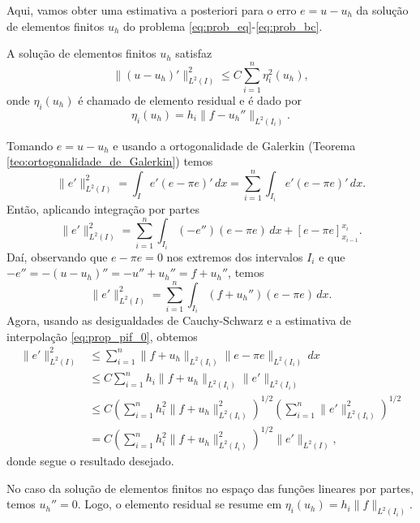 Aqui, vamos obter uma estimativa a posteriori para o erro $e = u - u_h$ da solução de elementos finitos $u_h$ do problema \eqref{eq:prob_eq}-\eqref{eq:prob_bc}.

\begin{teo}\label{teo:fem_est_a_posteriori}
  A solução de elementos finitos $u_h$ satisfaz
  \begin{equation}
    \|(u-u_h)'\|_{L^2(I)}^2 \leq C\sum_{i=1}^n \eta_i^2(u_h),
  \end{equation}
onde $\eta_i(u_h)$ é chamado de elemento residual e é dado por
\begin{equation}
  \eta_i(u_h) = h_i\|f - u_h''\|_{L^2(I_i)}.
\end{equation}
\end{teo}
\begin{dem}
  Tomando $e = u - u_h$ e usando a ortogonalidade de Galerkin (Teorema \ref{teo:ortogonalidade_de_Galerkin}) temos
  \begin{equation}
    \|e'\|_{L^2(I)}^2 = \int_I e'(e-\pi e)'\,dx = \sum_{i=1}^n\int_{I_i} e'(e-\pi e)'\,dx.
  \end{equation}
  Então, aplicando integração por partes
  \begin{equation}
    \|e'\|_{L^2(I)}^2 = \sum_{i=1}^n\int_{I_i}(-e'')(e-\pi e)\,dx + [e-\pi e]_{x_{i-1}}^{x_i}.
  \end{equation}
  Daí, observando que $e-\pi e = 0$ nos extremos dos intervalos $I_i$ e que $-e'' = -(u-u_h)'' = -u'' + u_h'' = f + u_h''$, temos
  \begin{equation}
    \|e'\|_{L^2(I)}^2 = \sum_{i=1}^n\int_{I_i}(f+u_h'')(e-\pi e)\,dx.
  \end{equation}
  Agora, usando as desigualdades de Cauchy-Schwarz e a estimativa de interpolação \eqref{eq:prop_pif_0}, obtemos
  \begin{align}
    \|e'\|_{L^2(I)}^2 &\leq \sum_{i=1}^n\|f+u_h\|_{L^2(I_i)}\|e-\pi e\|_{L^2(I_i)}\,dx\\
    &\leq C\sum_{i=1}^nh_i\|f+u_h\|_{L^2(I_i)}\|e'\|_{L^2(I_i)}\\
    &\leq C\left(\sum_{i=1}^n h_i^2\|f+u_h\|_{L^2(I_i)}^2\right)^{1/2}\left(\sum_{i=1}^n \|e'\|_{L^2(I_i)}^2\right)^{1/2}\\
    &= C\left(\sum_{i=1}^n h_i^2\|f+u_h\|_{L^2(I_i)}^2\right)^{1/2}\|e'\|_{L^2(I)},
  \end{align}
  donde segue o resultado desejado.
\end{dem}

\begin{obs}
  No caso da solução de elementos finitos no espaço das funções lineares por partes, temos $u_h'' = 0$. Logo, o elemento residual se resume em $\eta_i(u_h) = h_i\|f\|_{L^2(I_i)}$.
\end{obs}


